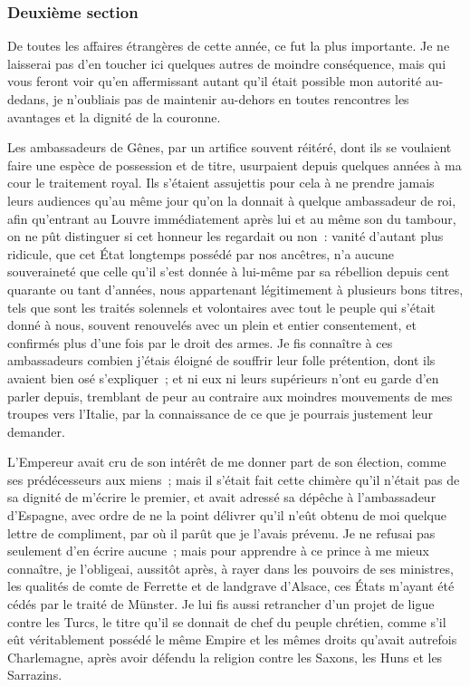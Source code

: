 \documentclass[french,twoside]{book} %
\begin{document}
\subsubsection[{Deuxième section}]{Deuxième section}
\noindent De toutes les affaires étrangères de cette année, ce fut la plus importante. Je ne laisserai pas d’en toucher ici quelques autres de moindre conséquence, mais qui vous feront voir qu’en affermissant autant qu’il était possible mon autorité au-dedans, je n’oubliais pas de maintenir au-dehors en toutes rencontres les avantages et la dignité de la couronne.\par
Les ambassadeurs de Gênes, par un artifice souvent réitéré, dont ils se voulaient faire une espèce de possession et de titre, usurpaient depuis quelques années à ma cour le traitement royal. Ils s’étaient assujettis pour cela à ne prendre jamais leurs audiences qu’au même jour qu’on la donnait à quelque ambassadeur de roi, afin qu’entrant au Louvre immédiatement après lui et au même son du tambour, on ne pût distinguer si cet honneur les regardait ou non : vanité d’autant plus ridicule, que cet État longtemps possédé par nos ancêtres, n’a aucune souveraineté que celle qu’il s’est donnée à lui-même par sa rébellion depuis cent quarante ou tant d’années, nous appartenant légitimement à plusieurs bons titres, tels que sont les traités solennels et volontaires avec tout le peuple qui s’était donné à nous, souvent renouvelés avec un plein et entier consentement, et confirmés plus d’une fois par le droit des armes. Je fis connaître à ces ambassadeurs combien j’étais éloigné de souffrir leur folle prétention, dont ils avaient bien osé s’expliquer ; et ni eux ni leurs supérieurs n’ont eu garde d’en parler depuis, tremblant de peur au contraire aux moindres mouvements de mes troupes vers l’Italie, par la connaissance de ce que je pourrais justement leur demander.\par
L’Empereur avait cru de son intérêt de me donner part de son élection, comme ses prédécesseurs aux miens ; mais il s’était fait cette chimère qu’il n’était pas de sa dignité de m’écrire le premier, et avait adressé sa dépêche à l’ambassadeur d’Espagne, avec ordre de ne la point délivrer qu’il n’eût obtenu de moi quelque lettre de compliment, par où il parût que je l’avais prévenu. Je ne refusai pas seulement d’en écrire aucune ; mais pour apprendre à ce prince à me mieux connaître, je l’obligeai, aussitôt après, à rayer dans les pouvoirs de ses ministres, les qualités de comte de Ferrette et de landgrave d’Alsace, ces États m’ayant été cédés par le traité de Münster. Je lui fis aussi retrancher d’un projet de ligue contre les Turcs, le titre qu’il se donnait de chef du peuple chrétien, comme s’il eût véritablement possédé le même Empire et les mêmes droits qu’avait autrefois Charlemagne, après avoir défendu la religion contre les Saxons, les Huns et les Sarrazins.\par
\end{document}
